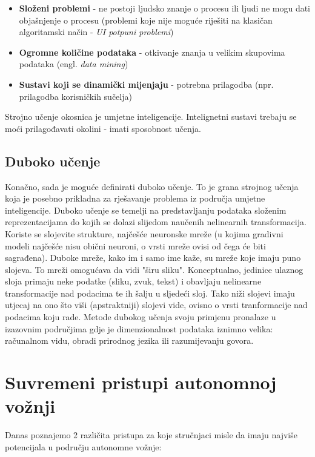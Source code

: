 \documentclass[seminar, utf8, numeric]{fer}
\begin{document}
\begin{itemize}
	\item{\textbf{Složeni problemi} - ne postoji ljudsko znanje o procesu ili ljudi ne mogu dati objašnjenje o procesu (problemi koje nije moguće riješiti na klasičan algoritamski način - \textit{UI potpuni problemi})}
	
	\item{\textbf{Ogromne količine podataka} - otkivanje znanja u velikim skupovima podataka (engl. \textit{data mining})}
	
	\item{\textbf{Sustavi koji se dinamički mijenjaju} - potrebna prilagodba (npr. prilagodba korisničkih sučelja)}
\end{itemize}

\noindent
Strojno učenje okosnica je umjetne inteligencije. Intelignetni sustavi trebaju se moći prilagođavati okolini - imati sposobnost učenja.

\section{Duboko učenje}
Konačno, sada je moguće definirati duboko učenje. To je grana strojnog učenja koja je posebno prikladna za rješavanje problema iz područja umjetne inteligencije. Duboko učenje se temelji na predstavljanju podataka složenim reprezentacijama do kojih se dolazi slijedom naučenih nelinearnih transformacija. Koriste se slojevite strukture, najčešće neuronske mreže (u kojima gradivni modeli najčešće nisu obični neuroni, o vrsti mreže ovisi od čega će biti sagrađena). Duboke mreže, kako im i samo ime kaže, su mreže koje imaju puno slojeva. To mreži omogućava da vidi "širu sliku". Konceptualno, jedinice ulaznog sloja primaju neke podatke (sliku, zvuk, tekst) i obavljaju nelinearne transformacije nad podacima te ih šalju u sljedeći sloj. Tako niži slojevi imaju utjecaj na ono što viši (apstraktniji) slojevi vide, ovisno o vrsti tranformacije nad podacima koju rade. Metode dubokog učenja svoju primjenu pronalaze u izazovnim područjima gdje je dimenzionalnost podataka iznimno velika: računalnom vidu, obradi prirodnog jezika ili razumijevanju govora.

\chapter{Suvremeni pristupi autonomnoj vožnji}
Danas poznajemo 2 različita pristupa za koje stručnjaci misle da imaju najviše potencijala u području autonomne vožnje:
\end{document}

